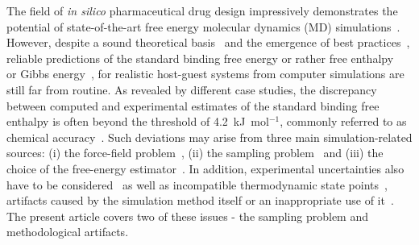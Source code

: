 \documentclass[9pt,lessons,pubversion]{livecoms}
\begin{document}
The field of \textit{in silico} pharmaceutical drug design impressively demonstrates  the potential of state-of-the-art free energy molecular dynamics (MD) simulations~\cite{leelananda2016computational}.
However, despite a sound theoretical basis~\cite{gilson1997statistical, boresch2003absolute} and the emergence of best practices~\cite{pohorille2010good}, 
reliable predictions of the standard binding free energy or rather free enthalpy~\cite{19781} or Gibbs energy~\cite{quantities1988units}, for realistic host-guest systems from computer simulations are still far from routine. 
As revealed by different case studies, the discrepancy between computed and experimental estimates of the standard binding free enthalpy is often beyond the threshold of 4.2~kJ~mol$^{-1}$, 
commonly referred to as chemical accuracy~\cite{pople1999nobel}.
Such deviations may arise from three main simulation-related sources: 
(i) the force-field problem~\cite{rocklin2013calculating,yin2015toward}, (ii) the sampling problem~\cite{zuckerman2011equilibrium} and (iii) the choice of the free-energy estimator~\cite{christ2010basic}. 
In addition, experimental uncertainties also have to be considered~\cite{van2006biomolecular} as well as incompatible thermodynamic state points~\cite{konig2012predicting}, 
artifacts caused by the simulation method itself or an inappropriate use of it~\cite{wong2016good}.
The present article covers two of these issues - the sampling problem and methodological artifacts.
\end{document}
